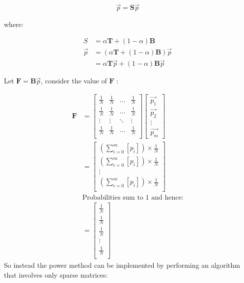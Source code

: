 \documentclass[11pt]{article}
\begin{document}
\begin{align}
\vec{p}= \mathbf{S} \vec{p}
\end{align}

where:

\begin{align}
S &= \alpha \mathbf{T} +  \left( 1 - \alpha \right) \mathbf{B} \\
\vec{p} &= \left( \alpha \mathbf{T} +  \left( 1 - \alpha \right) \mathbf{B} \right) \vec{p}\\
&= \alpha \mathbf{T}\vec{p} +  \left( 1-\alpha \right) \mathbf{B} \vec{p}
\end{align}

Let \(\mathbf{F}= \mathbf{B}\vec{p}\), consider the value of \(\mathbf{F}\) :

\begin{align}
\mathbf{F} &=
\begin{bmatrix}
\frac{1}{N} & \frac{1}{N} & \ldots & \frac{1}{N} \\
\frac{1}{N} & \frac{1}{N} & \ldots & \frac{1}{N} \\
\vdots      & \vdots      & \ddots & \vdots \\
\frac{1}{N} & \frac{1}{N} & \ldots & \frac{1}{N} \\
\end{bmatrix} \label{eq:bgVal2}
\begin{bmatrix}
\vec{p_1} \\ \vec{p_2} \\ \vdots \\ \vec{p_m}
\end{bmatrix}  \\
&= \begin{bmatrix}
\left( \sum^{m}_{i= 0}   \left[ p_i \right]  \right) \times \frac{1}{N} \\
\left( \sum^{m}_{i= 0}   \left[ p_i \right]  \right) \times \frac{1}{N} \\
\vdots  \\
\left( \sum^{m}_{i= 0}   \left[ p_i \right]  \right) \times \frac{1}{N} \\
\end{bmatrix}  \\
& \text{Probabilities sum to 1 and hence:} \\
&= \begin{bmatrix}
\frac{1}{N} \\
\frac{1}{N} \\
\frac{1}{N} \\
\vdots  \\
\frac{1}{N} \\
\end{bmatrix}
\end{align}
So instead the power method can be implemented by performing an algorithm that involves only sparse matrices:
\end{document}
